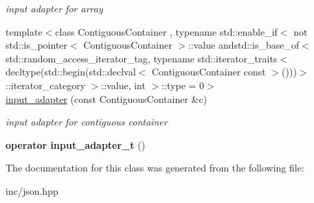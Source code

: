 \begin{DoxyCompactItemize}
\begin{DoxyCompactList}\small\item\em input adapter for array \end{DoxyCompactList}\item 
{\footnotesize template$<$class Contiguous\+Container , typename std\+::enable\+\_\+if$<$ not std\+::is\+\_\+pointer$<$ Contiguous\+Container $>$\+::value andstd\+::is\+\_\+base\+\_\+of$<$ std\+::random\+\_\+access\+\_\+iterator\+\_\+tag, typename std\+::iterator\+\_\+traits$<$ decltype(std\+::begin(std\+::declval$<$ Contiguous\+Container const  $>$()))$>$\+::iterator\+\_\+category $>$\+::value, int $>$\+::type  = 0$>$ }\\\hyperlink{classnlohmann_1_1detail_1_1input__adapter_a6f92fe82cb49a508dbfb297c5630cc7f}{input\+\_\+adapter} (const Contiguous\+Container \&c)\hypertarget{classnlohmann_1_1detail_1_1input__adapter_a6f92fe82cb49a508dbfb297c5630cc7f}{}\label{classnlohmann_1_1detail_1_1input__adapter_a6f92fe82cb49a508dbfb297c5630cc7f}

\begin{DoxyCompactList}\small\item\em input adapter for contiguous container \end{DoxyCompactList}\item 
{\bfseries operator input\+\_\+adapter\+\_\+t} ()\hypertarget{classnlohmann_1_1detail_1_1input__adapter_a4ef04b9490247fc38f3d1c2a9e18789b}{}\label{classnlohmann_1_1detail_1_1input__adapter_a4ef04b9490247fc38f3d1c2a9e18789b}

\end{DoxyCompactItemize}


The documentation for this class was generated from the following file\+:\begin{DoxyCompactItemize}
\item 
inc/json.\+hpp\end{DoxyCompactItemize}
